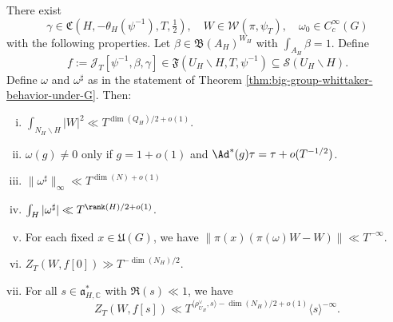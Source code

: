 \begin{lemma}\label{lem:there-exists-begin}
  There exist
  \begin{equation*}
    \gamma \in \mathfrak{C}(H, -\theta_H(\psi^{-1}), T, \tfrac{1}{2}),
    \quad
    W \in \mathcal{W}(\pi,\psi_T),
    \quad
    \omega_0 \in C_c^\infty(G)
  \end{equation*}
  with the following properties.  Let $\beta \in \mathfrak{B}(A_H)^{W_H}$ with $\int_{A_H} \beta  = 1$.  Define
  \begin{equation*}
    f := \mathcal{J}_T[\psi^{-1},\beta,\gamma] \in \mathfrak{F}(U_H \backslash H, T, \psi^{-1}) \subseteq \mathcal{S}(U_H \backslash H).
  \end{equation*}
  Define $\omega$ and $\omega^\sharp$ as in the statement of Theorem \ref{thm:big-group-whittaker-behavior-under-G}.  Then:
  \begin{enumerate}[(i)]
  \item \label{item:lemma-there-exists-gamma-W-1} $\int_{N_H \backslash H} |W|^2 \ll T^{\dim(Q_H) / 2 + o(1)}$.
  \item \label{itm:lemma-exists-omega-2}  $\omega(g) \neq 0$ only if $g = 1 + o(1)$ and $\Ad^*(g) \tau = \tau + o(T^{-1/2})$.
  \item \label{itm:lemma-exists-omega-3} $\|\omega^\sharp\|_{\infty} \ll T^{\dim(N)+o(1)}$
  \item $\int_H |\omega^\sharp| \ll T^{\rank(H)/2 + o(1)}$.
  \item \label{item:lemma-there-exists-gamma-W-5} For each fixed $x \in \mathfrak{U}(G)$, we have $\|\pi(x) (\pi(\omega)W - W)\| \ll T^{-\infty}$.
  \item \label{item:lemma-there-exists-gamma-W-6}  $Z_T(W,f[0]) \gg T^{-\dim(N_H)/2}$.
  \item \label{item:lemma-there-exists-gamma-W-7} For all $s \in \mathfrak{a}_{H,\mathbb{C}}^*$ with $\Re(s) \ll 1$, we have
    \begin{equation*}
      Z_T(W,f[s]) \ll T^{\langle \rho_{U_H}^\vee, s \rangle - \dim(N_H)/2 + o(1)} \langle s \rangle^{-\infty}.
    \end{equation*}
  \end{enumerate}
\end{lemma}
